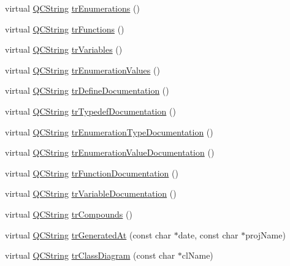 \begin{DoxyCompactItemize}
\item 
virtual \hyperlink{class_q_c_string}{Q\+C\+String} \hyperlink{class_translator_arabic_a326d79ef3895d320d904752ab72b48a2}{tr\+Enumerations} ()
\item 
virtual \hyperlink{class_q_c_string}{Q\+C\+String} \hyperlink{class_translator_arabic_abb708c38af7bc9684a7a43ef5656c141}{tr\+Functions} ()
\item 
virtual \hyperlink{class_q_c_string}{Q\+C\+String} \hyperlink{class_translator_arabic_a621dbf463cf8716cc73199fdebe67376}{tr\+Variables} ()
\item 
virtual \hyperlink{class_q_c_string}{Q\+C\+String} \hyperlink{class_translator_arabic_ab18ed450a4ac10051ca9dbcda44ffb99}{tr\+Enumeration\+Values} ()
\item 
virtual \hyperlink{class_q_c_string}{Q\+C\+String} \hyperlink{class_translator_arabic_aa367047c22e78f701ae4e151a57983ab}{tr\+Define\+Documentation} ()
\item 
virtual \hyperlink{class_q_c_string}{Q\+C\+String} \hyperlink{class_translator_arabic_a8dcda8ec8d47583d94567a48154cdcf0}{tr\+Typedef\+Documentation} ()
\item 
virtual \hyperlink{class_q_c_string}{Q\+C\+String} \hyperlink{class_translator_arabic_a098c2c8b18b1c2d449f08dd1b67f27c4}{tr\+Enumeration\+Type\+Documentation} ()
\item 
virtual \hyperlink{class_q_c_string}{Q\+C\+String} \hyperlink{class_translator_arabic_ad8811a0183622b8db263162e4b9e8094}{tr\+Enumeration\+Value\+Documentation} ()
\item 
virtual \hyperlink{class_q_c_string}{Q\+C\+String} \hyperlink{class_translator_arabic_a97ffd13d19b3b5d0e0dfdf8a4af2928e}{tr\+Function\+Documentation} ()
\item 
virtual \hyperlink{class_q_c_string}{Q\+C\+String} \hyperlink{class_translator_arabic_a2c30e187e8c3b7c9fb36b8e81052907f}{tr\+Variable\+Documentation} ()
\item 
virtual \hyperlink{class_q_c_string}{Q\+C\+String} \hyperlink{class_translator_arabic_a08ecec2f5aa2069025984ad039b594bd}{tr\+Compounds} ()
\item 
virtual \hyperlink{class_q_c_string}{Q\+C\+String} \hyperlink{class_translator_arabic_a044107447821682b67108e2ecfebe8bb}{tr\+Generated\+At} (const char $\ast$date, const char $\ast$proj\+Name)
\item 
virtual \hyperlink{class_q_c_string}{Q\+C\+String} \hyperlink{class_translator_arabic_a87f8377933d06087c5f870a8d72787b6}{tr\+Class\+Diagram} (const char $\ast$cl\+Name)

\end{DoxyCompactItemize}
